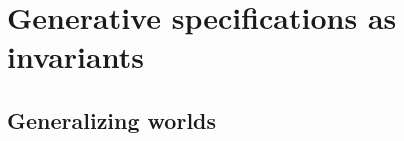 \chapter{Generative specifications as invariants}
\label{chapter-gen}









\section{Generalizing worlds}

